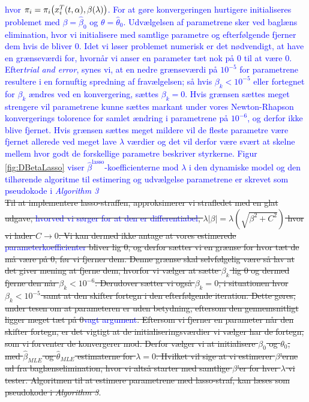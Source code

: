 \documentclass[11pt,a4paper]{article}
\begin{document}
\textcolor{blue}{hvor $\pi_i=\pi_i\big{(}x_i^T(t,\alpha),\beta(\lambda)\big{)}$. For at gøre konvergeringen hurtigere initialiseres problemet med $\beta=\hat{\beta}_0$ og $\theta=\hat{\theta}_0$. Udvælgelsen af parametrene sker ved baglæns elimination, hvor vi initialisere med samtlige parametre og efterfølgende fjerner dem hvis de bliver 0. Idet vi løser problemet numerisk er det nødvendigt, at have en grænseværdi for, hvornår vi anser en parameter tæt nok på 0 til at være 0. Efter\textit{trial and error}, synes vi, at en nedre grænseværdi på $10^{-5}$ for parametrene resultere i en fornuftig spredning af fravælgelsen; så hvis $\beta_k<10^{-5}$ eller fortegnet for $\beta_k$ ændres ved en konvergering, sættes $\beta_k=0$. Hvis grænsen sættes meget strengere vil parametrene kunne sættes markant under vores Newton-Rhapson konvergerings tolorence for samlet ændring i parametrene på $10^{-6}$, og derfor ikke blive fjernet. Hvis grænsen sættes meget mildere vil de fleste parametre være fjernet allerede ved meget lave $\lambda$ værdier og det vil derfor være svært at skelne mellem hvor godt de forskellige parametre beskriver styrkerne. Figur \ref{fig:DBetaLasso} viser $\hat{\beta}^{\text{lasso}}$-koefficienterne mod $\lambda$ i den dynamiske model og den tilhørende algoritme til estimering og udvælgelse parametrene er skrevet som pseudokode i \textit{Algorithm 3}}\\
\sout{Til at implementere lasso-straffen, approksimerer vi strafledet med en glat udgave, \textcolor{blue}{hvorved vi sørger for at den er differentiabel}, $\lambda |\beta| = \lambda(\sqrt{\beta^2+C^2})$ hvor vi lader $C\rightarrow 0$. Vi kan dermed ikke antage at vores estimerede \textcolor{blue}{parameterkoefficienter} bliver lig 0, og derfor sætter vi en grænse for hvor tæt de må være på 0, før vi fjerner dem. Denne grænse skal selvfølgelig være så lav at det giver mening at fjerne dem, hvorfor vi vælger at sætte $\beta_k$ lig 0 og dermed fjerne den når $\beta_k<10^{-6}$. Derudover sætter vi også $\beta_k = 0$, i situationen hvor $\beta_k<10^{-5}$ samt at den skifter fortegn i den efterfølgende iteration. Dette gøres, under tesen om at parameteren er uden betydning, eftersom den gennemsnitligt ligger meget tæt på 0\textcolor{blue}{vagt argument}. Eftersom vi fjerner en parameter når den skifter fortegn, er det vigtigt at de initialiseringsværdier vi vælger har de fortegn, som vi forventer de konvergerer mod. Derfor vælger vi at initialisere $\beta_0$ og $\theta_0$, med $\hat{\beta}_{MLE}$ og $\hat{\theta}_{MLE}$ estimaterne for $\lambda=0$. Hvilket vil sige at vi estimerer $\beta$'erne ud fra baglænselimination, hvor vi altså starter med samtlige $\beta$'er for hver $\lambda$ vi tester.
Algoritmen til at estimere parametrene med lasso-straf, kan læses som pseudokode i \textit{Algorithm 3}}.\\
\end{document}
